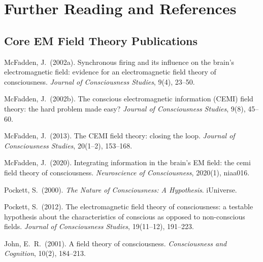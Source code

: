 \documentclass[11pt,a4paper]{report}
\begin{document}
\chapter{Further Reading and References}

\section*{Core EM Field Theory Publications}
\begin{enumerate}[label={[\arabic*]}, leftmargin=2.5em]
  \item McFadden, J.\ (2002a). Synchronous firing and its influence on the brain's electromagnetic field: evidence for an electromagnetic field theory of consciousness. \textit{Journal of Consciousness Studies}, 9(4), 23--50.
  \item McFadden, J.\ (2002b). The conscious electromagnetic information (CEMI) field theory: the hard problem made easy? \textit{Journal of Consciousness Studies}, 9(8), 45--60.
  \item McFadden, J.\ (2013). The CEMI field theory: closing the loop. \textit{Journal of Consciousness Studies}, 20(1--2), 153--168.
  \item McFadden, J.\ (2020). Integrating information in the brain's EM field: the cemi field theory of consciousness. \textit{Neuroscience of Consciousness}, 2020(1), niaa016.
  \item Pockett, S.\ (2000). \textit{The Nature of Consciousness: A Hypothesis}. iUniverse.
  \item Pockett, S.\ (2012). The electromagnetic field theory of consciousness: a testable hypothesis about the characteristics of conscious as opposed to non-conscious fields. \textit{Journal of Consciousness Studies}, 19(11--12), 191--223.
  \item John, E.\ R.\ (2001). A field theory of consciousness. \textit{Consciousness and Cognition}, 10(2), 184--213.
\end{enumerate}
\end{document}
